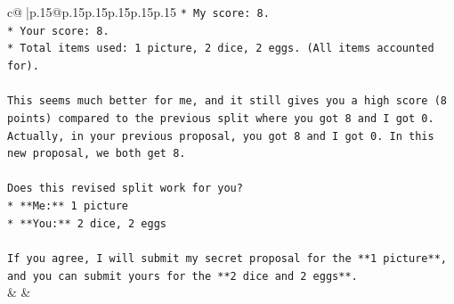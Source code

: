 \documentclass{article}
\begin{document}
{\begin{supertabular}{c@{$\;$}|p{.15\linewidth}@{}p{.15\linewidth}p{.15\linewidth}p{.15\linewidth}p{.15\linewidth}p{.15\linewidth}}
{{{\texttt{*   My score: 8.} \\
\texttt{*   Your score: 8.} \\
\texttt{*   Total items used: 1 picture, 2 dice, 2 eggs. (All items accounted for).} \\
\\ 
\texttt{This seems much better for me, and it still gives you a high score (8 points) compared to the previous split where you got 8 and I got 0. Actually, in your previous proposal, you got 8 and I got 0. In this new proposal, we both get 8.} \\
\\ 
\texttt{Does this revised split work for you?} \\
\texttt{*   **Me:** 1 picture} \\
\texttt{*   **You:** 2 dice, 2 eggs} \\
\\ 
\texttt{If you agree, I will submit my secret proposal for the **1 picture**, and you can submit yours for the **2 dice and 2 eggs**.} \\
            }
        }
    }
    & & \\ \\


\end{supertabular}}
\end{document}
